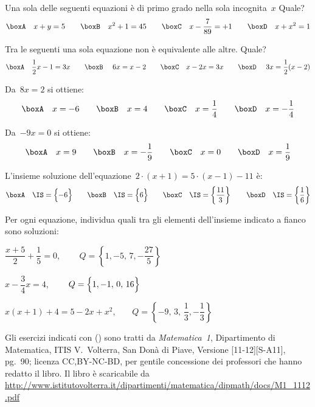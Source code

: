 \begin{esercizio}
\label{ese:13.45}
Una sola delle seguenti equazioni è di primo grado nella sola incognita~\(x\) 
Quale?
\[\boxA\quad x+y=5\qquad\boxB\quad x^{2}+1=45\qquad\boxC\quad 
x-\dfrac{7}{89}=+1\qquad\boxD\quad x+x^{2}=1\]
\end{esercizio}

\begin{esercizio}
\label{ese:13.46}
Tra le seguenti una sola equazione non è equivalente alle altre. Quale?
\[\boxA\quad \dfrac{1}{2}x-1=3x\qquad\boxB\quad~6x=x-2\qquad\boxC\quad 
x-2x=3x\qquad\boxD\quad~3x=\dfrac{1}{2}(x-2)\]
\end{esercizio}

\begin{esercizio}
\label{ese:13.47}
Da~\(8x=2\) si ottiene:
\[\boxA\quad x=-6\qquad\boxB\quad x=4\qquad\boxC\quad 
x=\dfrac{1}{4}\qquad\boxD\quad x=-{\dfrac{1}{4}}\]
\end{esercizio}

\begin{esercizio}
\label{ese:13.48}
Da~\(-9x=0\) si ottiene:
\[\boxA\quad x=9\qquad\boxB\quad x=-{\dfrac{1}{9}}\qquad\boxC\quad 
x=0\qquad\boxD\quad x=\dfrac{1}{9}\]
\end{esercizio}

\begin{esercizio}
\label{ese:13.49}
L'insieme soluzione dell'equazione~\(2\cdot \left(x+1\right)=5\cdot 
\left(x-1\right)-11\) è:
\[\boxA\quad \IS=\Bigl\{-6\Bigr\}\qquad\boxB\quad 
\IS=\Bigl\{6\Bigr\}\qquad\boxC\quad 
\IS=\left\{\dfrac{11}{3}\right\}\qquad\boxD\quad 
\IS=\left\{\dfrac{1}{6}\right\}\]
\end{esercizio}

\begin{esercizio}
\label{ese:13.50}
Per ogni equazione, individua quali tra gli elementi dell'insieme indicato a 
fianco sono soluzioni:
\begin{enumeratea}
\spazielenx
 \item \(\dfrac{x+5}{2}+\dfrac{1}{5}=0\), \(\qquad 
Q=\left\{1,-5,\,7,-\dfrac{27}{5}\right\}\)
 \item \(x-\dfrac{3}{4}x=4\), \(\qquad Q=\Bigl\{1,-1,\,0,\,16\Bigr\}\)
 \item \(x(x+1)+4=5-2x+x^{2}\),\(\qquad 
Q=\left\{-9,\,3,\,\dfrac{1}{3},-\dfrac{1}{3}\right\}\)
\end{enumeratea}
\end{esercizio}


Gli esercizi indicati con (\croce) sono tratti da \emph{Matematica~1}, 
Dipartimento di Matematica, ITIS V.~Volterra, San Donà di Piave, Versione 
[11-12][S-A11], pg.~90;
licenza CC,BY-NC-BD, per gentile concessione dei professori che hanno redatto 
il 
libro.
Il libro è scaricabile da 
\url{
http://www.istitutovolterra.it/dipartimenti/matematica/dipmath/docs/M1_1112.pdf}

